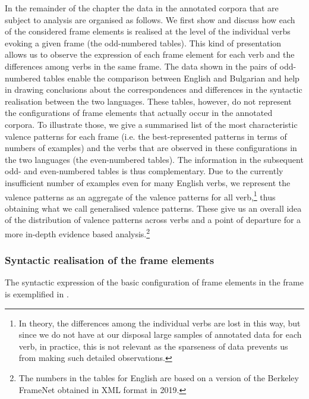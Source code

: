 \documentclass[output=paper,colorlinks,citecolor=brown]{langscibook}
\begin{document}
In the remainder of the chapter the data in the annotated corpora that are subject to analysis are organised as follows. We first show and discuss how each of the considered frame elements is realised at the level of the individual verbs evoking a given frame (the odd-numbered tables). This kind of presentation allows us to observe the expression of each frame element for each verb and the differences among verbs in the same frame. The data shown in the pairs of odd-numbered tables enable the comparison between English and Bulgarian and help in drawing conclusions about the correspondences and differences in the syntactic realisation between the two languages. These tables, however, do not represent the configurations of frame elements that actually occur in the annotated corpora. To illustrate those, we give a summarised list of the most characteristic valence patterns for each frame (i.e. the best-represented patterns in terms of numbers of examples) and the verbs that are observed in these configurations in the two languages (the even-numbered tables). The information in the subsequent odd- and even-numbered tables is thus complementary. Due to the currently insufficient number of examples even for many English verbs, we represent the valence patterns as an aggregate of the valence patterns for all verb,\footnote{In theory, the differences among the individual verbs are lost in this way, but since we do not have at our disposal large samples of annotated data for each verb, in practice, this is not relevant as the sparseness of data prevents us from making such detailed observations.} thus obtaining what we call generalised valence patterns. These give us an overall idea of the distribution of valence patterns across verbs and a point of departure for a more in-depth evidence based analysis.\footnote{The numbers in the tables for English are based on a version of the Berkeley FrameNet obtained in XML format in 2019.}

\subsubsection{Syntactic realisation of the  frame elements}

The syntactic expression of the basic configuration of frame elements in the  frame is exemplified in .
\end{document}
